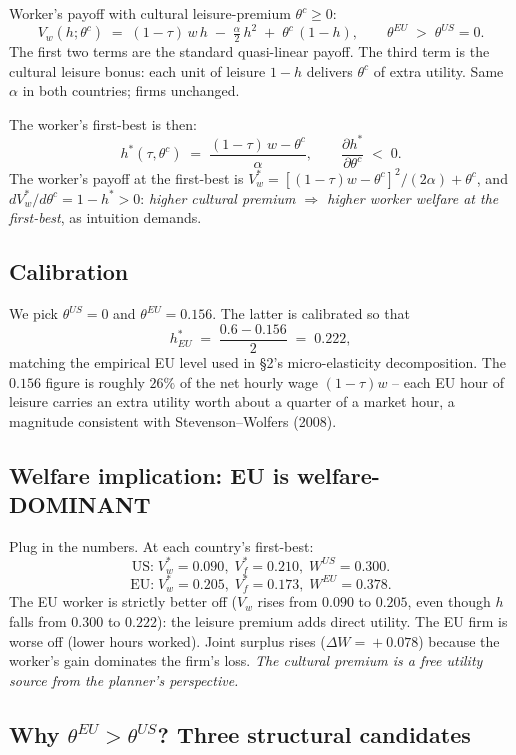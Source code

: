 \documentclass[11pt,a4paper]{article}
\begin{document}
Worker's payoff with cultural leisure-premium $\theta^c\!\geq\!0$:
\[
V_w(h;\theta^c)\;=\;(1-\tau)\,w\,h\;-\;\tfrac{\alpha}{2}\,h^2\;+\;\theta^c\,(1-h),
\qquad
\theta^{EU}\;>\;\theta^{US}\!=\!0.
\]
The first two terms are the standard quasi-linear payoff. The third
term is the cultural leisure bonus: each unit of leisure $1-h$
delivers $\theta^c$ of extra utility. Same $\alpha$ in both countries;
firms unchanged.

The worker's first-best is then:
\[
\boxed{\;h^\ast(\tau,\theta^c)\;=\;\frac{(1-\tau)\,w-\theta^c}{\alpha},
\qquad \frac{\partial h^\ast}{\partial \theta^c}\;<\;0.\;}
\]
The worker's payoff at the first-best is
$V_w^\ast\!=\![(1-\tau)w-\theta^c]^2/(2\alpha) + \theta^c$, and
$dV_w^\ast/d\theta^c\!=\!1-h^\ast\!>\!0$: \emph{higher cultural
premium $\Rightarrow$ higher worker welfare at the first-best}, as
intuition demands.

\subsection{Calibration}

We pick $\theta^{US}\!=\!0$ and $\theta^{EU}\!=\!0.156$. The latter is
calibrated so that
\[
h^\ast_{EU}\;=\;\frac{0.6-0.156}{2}\;=\;0.222,
\]
matching the empirical EU level used in \S 2's micro-elasticity
decomposition. The $0.156$ figure is roughly $26\%$ of the net hourly
wage $(1-\tau)w$ -- each EU hour of leisure carries an extra utility
worth about a quarter of a market hour, a magnitude consistent with
Stevenson--Wolfers (2008).

\subsection{Welfare implication: EU is welfare-DOMINANT}

Plug in the numbers. At each country's first-best:
\[
\text{US:}\;V_w^\ast\!=\!0.090,\;V_f^\ast\!=\!0.210,\;W^{US}\!=\!0.300.
\]
\[
\text{EU:}\;V_w^\ast\!=\!0.205,\;V_f^\ast\!=\!0.173,\;W^{EU}\!=\!0.378.
\]
The EU worker is strictly better off ($V_w$ rises from $0.090$ to
$0.205$, even though $h$ falls from $0.300$ to $0.222$): the leisure
premium adds direct utility. The EU firm is worse off (lower hours
worked). Joint surplus rises ($\Delta W\!=\!+0.078$) because the
worker's gain dominates the firm's loss. \emph{The cultural premium
is a free utility source from the planner's perspective.}

\subsection{Why $\theta^{EU}>\theta^{US}$? Three structural candidates}
\end{document}
